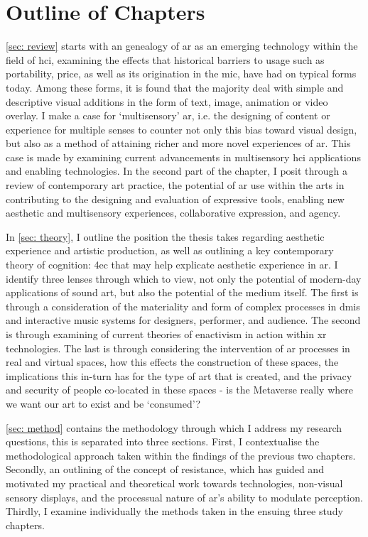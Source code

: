 \section{Outline of Chapters}\label{sec: introduction-outline}
\autoref{sec: review} starts with an genealogy of \gls{ar} as an emerging technology within the field of \gls{hci}, examining the effects that historical barriers to usage such as portability, price, as well as its origination in the \gls{mic}, have had on typical forms today. Among these forms, it is found that the majority deal with simple and descriptive visual additions in the form of text, image, animation or video overlay. I make a case for `multisensory' \gls{ar}, i.e. the designing of content or experience for multiple senses to counter not only this bias toward visual design, but also as a method of attaining richer and more novel experiences of \gls{ar}. This case is made by examining current advancements in multisensory \gls{hci} applications and enabling technologies. In the second part of the chapter, I posit through a review of contemporary art practice, the potential of \gls{ar} use within the arts in contributing to the designing and evaluation of expressive tools, enabling new aesthetic and multisensory experiences, collaborative expression, and agency.

In \autoref{sec: theory}, I outline the position the thesis takes regarding aesthetic experience and artistic production, as well as outlining a key contemporary theory of cognition: \gls{4ec} that may help explicate aesthetic experience in \gls{ar}. I identify three lenses through which to view, not only the potential of modern-day applications of sound \gls{art}, but also the potential of the medium itself. The first is through a consideration of the materiality and form of complex processes in \glspl{dmi} and interactive music systems for designers, performer, and audience. The second is through examining of current theories of enactivism in action within \gls{xr} technologies. The last is through considering the intervention of \gls{ar} processes in real and virtual spaces, how this effects the construction of these spaces, the implications this in-turn has for the type of art that is created, and the privacy and security of people co-located in these spaces - is the Metaverse really where we want our \gls{art} to exist and be `consumed'? 

\autoref{sec: method} contains the methodology through which I address my research questions, this is separated into three sections. First, I contextualise the methodological approach taken within the findings of the previous two chapters. Secondly, an outlining of the concept of resistance, which has guided and motivated my practical and theoretical work towards  technologies, non-visual sensory displays, and the processual nature of \gls{ar}'s ability to modulate perception. Thirdly, I examine individually the methods taken in the ensuing three study chapters.
 
